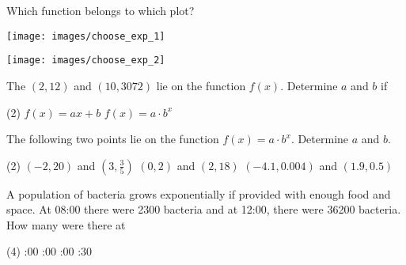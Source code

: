 \begin{exercise}
	Which function belongs to which plot?\\[10pt]
	\begin{minipage}{0.48\textwidth}
		\centering
		\texttt{[image: images/choose\_exp\_1]}
	\end{minipage}
	\begin{minipage}{0.48\textwidth}
		\centering
		\texttt{[image: images/choose\_exp\_2]}
	\end{minipage}
\end{exercise}
\begin{exercise}
	The $\left(2,12\right)$ and $\left(10,3072\right)$ lie on the function $f\left(x\right)$.
	Determine $a$ and $b$ if
	\begin{tasks}(2)
		\task $f\left(x\right)=ax+b$
		\task $f\left(x\right)=a\cdot b^x$
	\end{tasks}
\end{exercise}
\begin{exercise}
	The following two points lie on the function $f\left(x\right)=a\cdot b^x$.
	Determine $a$ and $b$.
	\begin{tasks}(2)
		\task $\left(-2,20\right)$ and $\left(3,\frac{3}{5}\right)$
		\task $\left(0,2\right)$ and $\left(2,18\right)$
		\task $\left(-4.1,0.004\right)$ and $\left(1.9,0.5\right)$
	\end{tasks}
\end{exercise}
\pagebreak
\begin{exercise}
	A population of bacteria grows exponentially if provided with enough food and space.
	At 08:00 there were 2300 bacteria and at 12:00, there were 36200 bacteria.
	How many were there at
	\begin{tasks}(4)
		:00
		:00
		:00
		:30
	\end{tasks}
\end{exercise}
